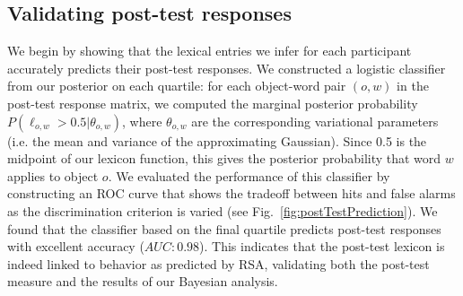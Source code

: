 \documentclass[10pt,letterpaper]{article}
\newcommand{\ndg}[1]{\textcolor{Green}{[ndg: #1]}}
\begin{document}


\subsection{Validating post-test responses}

We begin by showing that the lexical entries we infer for each participant accurately predicts their post-test responses. 
We constructed a logistic classifier from our posterior on each quartile: for each object-word pair $(o,w)$ in the post-test response matrix, we computed the marginal posterior probability $P(\ell_{o,w} > 0.5| \theta_{o,w})$, where $\theta_{o,w}$ are the corresponding variational parameters (i.e. the mean and variance of the approximating Gaussian). Since 0.5 is the midpoint of our lexicon function, this gives the posterior probability that word $w$ applies to object $o$. We evaluated the performance of this classifier by constructing an ROC curve that shows the tradeoff between hits and false alarms as the discrimination criterion is varied (see Fig.\ \ref{fig:postTestPrediction}). We found that the classifier based on the final quartile predicts post-test responses with excellent accuracy ($AUC: 0.98$). This indicates that the post-test lexicon is indeed linked to behavior as predicted by RSA, validating both the post-test measure and the results of our Bayesian analysis.
\end{document}
